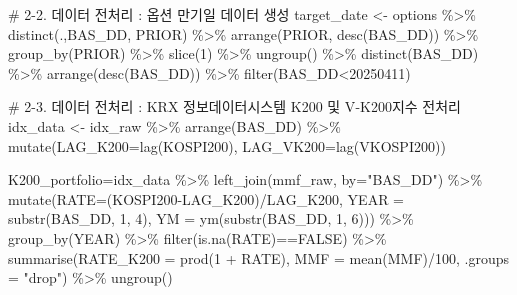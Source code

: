 \documentclass[
  a4paper,
  DIV=11,
  numbers=noendperiod]{scrreprt}
\newenvironment{Shaded}{\begin{snugshade}}{\end{snugshade}}
\newcommand{\AttributeTok}[1]{\textcolor[rgb]{0.40,0.45,0.13}{#1}}
\newcommand{\CommentTok}[1]{\textcolor[rgb]{0.37,0.37,0.37}{#1}}
\newcommand{\ConstantTok}[1]{\textcolor[rgb]{0.56,0.35,0.01}{#1}}
\newcommand{\DecValTok}[1]{\textcolor[rgb]{0.68,0.00,0.00}{#1}}
\newcommand{\FunctionTok}[1]{\textcolor[rgb]{0.28,0.35,0.67}{#1}}
\newcommand{\NormalTok}[1]{\textcolor[rgb]{0.00,0.23,0.31}{#1}}
\newcommand{\OtherTok}[1]{\textcolor[rgb]{0.00,0.23,0.31}{#1}}
\newcommand{\SpecialCharTok}[1]{\textcolor[rgb]{0.37,0.37,0.37}{#1}}
\newcommand{\StringTok}[1]{\textcolor[rgb]{0.13,0.47,0.30}{#1}}
\begin{document}
\begin{Shaded}
\begin{Highlighting}[]
\CommentTok{\# 2{-}2. 데이터 전처리 : 옵션 만기일 데이터 생성}
\NormalTok{target\_date }\OtherTok{\textless{}{-}}\NormalTok{ options }\SpecialCharTok{\%\textgreater{}\%} 
  \FunctionTok{distinct}\NormalTok{(.,BAS\_DD, PRIOR) }\SpecialCharTok{\%\textgreater{}\%} 
  \FunctionTok{arrange}\NormalTok{(PRIOR, }\FunctionTok{desc}\NormalTok{(BAS\_DD)) }\SpecialCharTok{\%\textgreater{}\%} 
  \FunctionTok{group\_by}\NormalTok{(PRIOR) }\SpecialCharTok{\%\textgreater{}\%} 
  \FunctionTok{slice}\NormalTok{(}\DecValTok{1}\NormalTok{) }\SpecialCharTok{\%\textgreater{}\%} 
  \FunctionTok{ungroup}\NormalTok{() }\SpecialCharTok{\%\textgreater{}\%} 
  \FunctionTok{distinct}\NormalTok{(BAS\_DD) }\SpecialCharTok{\%\textgreater{}\%} 
  \FunctionTok{arrange}\NormalTok{(}\FunctionTok{desc}\NormalTok{(BAS\_DD)) }\SpecialCharTok{\%\textgreater{}\%} 
  \FunctionTok{filter}\NormalTok{(BAS\_DD}\SpecialCharTok{\textless{}}\DecValTok{20250411}\NormalTok{)}

\CommentTok{\# 2{-}3. 데이터 전처리 : KRX 정보데이터시스템 K200 및 V{-}K200지수 전처리}
\NormalTok{idx\_data }\OtherTok{\textless{}{-}}\NormalTok{ idx\_raw }\SpecialCharTok{\%\textgreater{}\%}
  \FunctionTok{arrange}\NormalTok{(BAS\_DD) }\SpecialCharTok{\%\textgreater{}\%} 
  \FunctionTok{mutate}\NormalTok{(}\AttributeTok{LAG\_K200=}\FunctionTok{lag}\NormalTok{(KOSPI200),}
         \AttributeTok{LAG\_VK200=}\FunctionTok{lag}\NormalTok{(VKOSPI200))}

\NormalTok{K200\_portfolio}\OtherTok{=}\NormalTok{idx\_data }\SpecialCharTok{\%\textgreater{}\%} 
  \FunctionTok{left\_join}\NormalTok{(mmf\_raw, }\AttributeTok{by=}\StringTok{"BAS\_DD"}\NormalTok{) }\SpecialCharTok{\%\textgreater{}\%} 
  \FunctionTok{mutate}\NormalTok{(}\AttributeTok{RATE=}\NormalTok{(KOSPI200}\SpecialCharTok{{-}}\NormalTok{LAG\_K200)}\SpecialCharTok{/}\NormalTok{LAG\_K200,}
         \AttributeTok{YEAR =} \FunctionTok{substr}\NormalTok{(BAS\_DD, }\DecValTok{1}\NormalTok{, }\DecValTok{4}\NormalTok{),}
         \AttributeTok{YM =} \FunctionTok{ym}\NormalTok{(}\FunctionTok{substr}\NormalTok{(BAS\_DD, }\DecValTok{1}\NormalTok{, }\DecValTok{6}\NormalTok{))) }\SpecialCharTok{\%\textgreater{}\%}
  \FunctionTok{group\_by}\NormalTok{(YEAR) }\SpecialCharTok{\%\textgreater{}\%}
  \FunctionTok{filter}\NormalTok{(}\FunctionTok{is.na}\NormalTok{(RATE)}\SpecialCharTok{==}\ConstantTok{FALSE}\NormalTok{) }\SpecialCharTok{\%\textgreater{}\%} 
  \FunctionTok{summarise}\NormalTok{(}\AttributeTok{RATE\_K200 =} \FunctionTok{prod}\NormalTok{(}\DecValTok{1} \SpecialCharTok{+}\NormalTok{ RATE),}
            \AttributeTok{MMF =} \FunctionTok{mean}\NormalTok{(MMF)}\SpecialCharTok{/}\DecValTok{100}\NormalTok{,}
            \AttributeTok{.groups =} \StringTok{"drop"}\NormalTok{) }\SpecialCharTok{\%\textgreater{}\%}
  \FunctionTok{ungroup}\NormalTok{()}


\end{Highlighting}
\end{Shaded}
\end{document}
